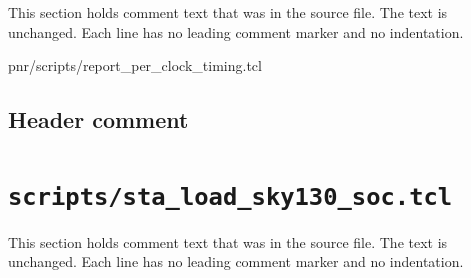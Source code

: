 This section holds comment text that was in the source file. The text is unchanged. Each line has no leading comment marker and no indentation.

\begin{relocated}{pnr/scripts/report_per_clock_timing.tcl}

\subsection*{Header comment}


\end{relocated}

\section{\texttt{scripts/sta\_load\_sky130\_soc.tcl}}\label{tm:pd:scripts-sta-load-sky130-soc-tcl}

This section holds comment text that was in the source file. The text is unchanged. Each line has no leading comment marker and no indentation.

